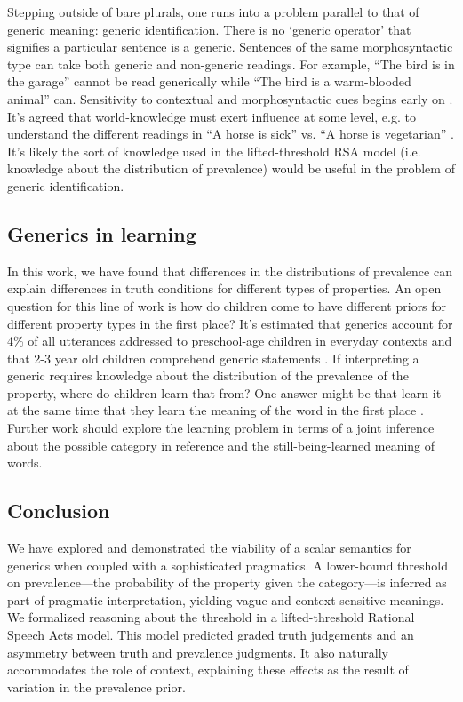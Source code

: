 \documentclass[10pt,letterpaper]{article}
\begin{document}
Stepping outside of bare plurals, one runs into a problem parallel to that of generic meaning: generic identification. There is no `generic operator' that signifies a particular sentence is a generic. Sentences of the same morphosyntactic type can take both generic and non-generic readings. For example, ``The bird is in the garage'' cannot be read generically while ``The bird is a warm-blooded animal'' can. Sensitivity to contextual and morphosyntactic cues begins early on \cite{Cimpian2008}. It's agreed that world-knowledge must exert influence at some level, e.g. to understand the different readings in ``A horse is sick'' vs. ``A horse is vegetarian'' \cite{Gelman2004}. It's likely the sort of knowledge used in the lifted-threshold RSA model (i.e. knowledge about the distribution of prevalence) would be useful in the problem of generic identification. 

\subsection{Generics in learning}

In this work, we have found that differences in the distributions of prevalence can explain differences in truth conditions for different types of properties. An open question for this line of work is how do children come to have different priors for different property types in the first place? It's estimated that generics account for 4\% of all utterances addressed to preschool-age children in everyday contexts \cite{Gelman2008} and that 2-3 year old children comprehend generic statements \cite{Cimpian2011, Gelman2003}. If interpreting a generic requires knowledge about the distribution of the prevalence of the property, where do children learn that from? One answer might be that learn it at the same time that they learn the meaning of the word in the first place \cite{Frank2009}. Further work should explore the learning problem in terms of a joint inference about the possible category in reference and the still-being-learned meaning of words. 
 
\subsection{Conclusion} 


We have explored and demonstrated the viability of a scalar semantics for generics when coupled with a sophisticated pragmatics. 
A lower-bound threshold on prevalence---the probability of the property given the category---is inferred as part of pragmatic interpretation, yielding vague and context sensitive meanings. 
%
%
We formalized reasoning about the threshold in a lifted-threshold Rational Speech Acts model. This model predicted graded truth judgements and an asymmetry between truth and prevalence judgments. It also naturally accommodates the role of context, explaining these effects as the result of variation in the prevalence prior. 
\end{document}
